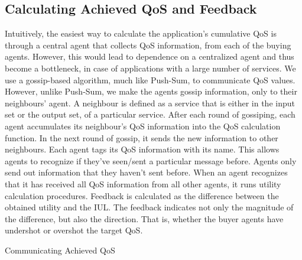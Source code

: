 \documentclass[10pt,journal,compsoc]{IEEEtran}
\begin{document}
\subsection{Calculating Achieved QoS and Feedback}
Intuitively, the easiest way to calculate the application's cumulative QoS is through a central agent that collects QoS information, from each of the buying agents. However, this would lead to dependence on a centralized agent and thus become a bottleneck, in case of applications with a large number of services. We use a gossip-based algorithm, much like Push-Sum\cite{Kempe2003Gossip-Based}, to communicate QoS values. However, unlike Push-Sum, we make the agents gossip information, only to their neighbours' agent. A neighbour is defined as a service that is either in the input set or the output set, of a particular service. After each round of gossiping, each agent accumulates its neighbour's QoS information into the QoS calculation function. In the next round of gossip, it sends the new information to other neighbours. Each agent tags its QoS information with its name. This allows agents to recognize if they've seen/sent a particular message before. Agents only send out information that they haven't sent before. When an agent recognizes that it has received all QoS information from all other agents, it runs utility calculation procedures. Feedback is calculated as the difference between the obtained utility and the IUL. The feedback indicates not only the magnitude of the difference, but also the direction. That is, whether the buyer agents have undershot or overshot the target QoS.   
	
\begin{algorithm}
 \caption{Communicating Achieved QoS}
 \label{Communication}
\end{algorithm}
\end{document}
